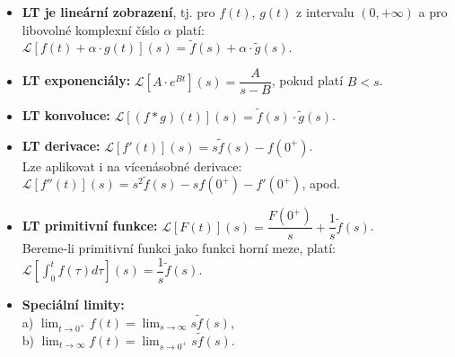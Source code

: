 \begin{itemize}
  \item \textbf{LT je lineární zobrazení}, tj. pro $f(t)$, $g(t)$ z intervalu $(0,+\infty)$ a pro libovolné komplexní číslo $\alpha$ platí: $ \mathcal{L}[f(t) + \alpha \cdot g(t)](s) = \tilde{f}(s) + \alpha \cdot \tilde{g}(s). $
  \item \textbf{LT exponenciály:} $ \mathcal{L}[A \cdot e^{Bt}](s) = \dfrac{A}{s-B}$, pokud platí $B < s$.
  \item \textbf{LT konvoluce:} $\mathcal{L}[(f*g)(t)](s) = \tilde{f}(s) \cdot \tilde{g}(s)$.
  \item \textbf{LT derivace:} $\mathcal{L}[f'(t)](s) = s \tilde{f}(s) - f(0^+)$.\\
  Lze aplikovat i na vícenásobné derivace: $\mathcal{L}[f''(t)](s) = s^2 \tilde{f}(s) - s f(0^+) - f'(0^+)$, apod.
  \item \textbf{LT primitivní funkce:} $\mathcal{L} [F(t)] (s) = \dfrac{F(0^+)}{s} + \dfrac{1}{s}\tilde{f}(s)$.\\
  Bereme-li primitivní funkci jako funkci horní meze, platí: $\mathcal{L} \left [ \int_0^t f(\tau) d\tau \right ] (s) = \dfrac{1}{s}\tilde{f}(s)$.
  \item \textbf{Speciální limity:}\\
  a) $\lim_{t \to 0^+} f(t) = \lim_{s \to \infty} s\tilde{f}(s)$,\\
  b) $\lim_{t \to \infty} f(t) = \lim_{s \to 0^+} s\tilde{f}(s)$.
\end{itemize}
